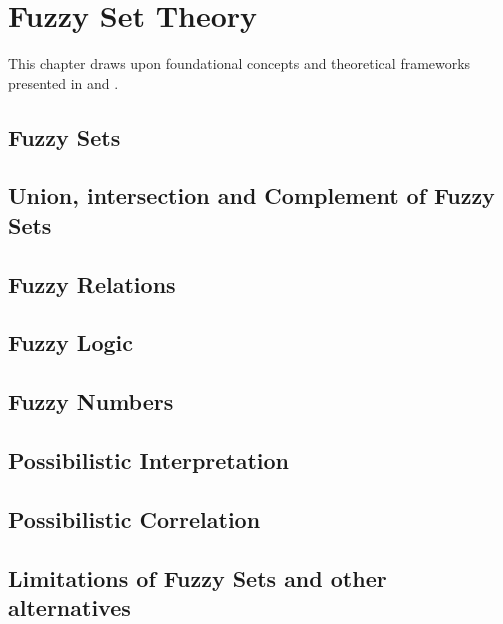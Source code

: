 \chapter{Fuzzy Set Theory}
This chapter draws upon foundational concepts and theoretical frameworks presented in \cite{FULLER1} and \cite{FULLER2}. 

\section{Fuzzy Sets}

\section{Union, intersection and Complement of Fuzzy Sets}

\section{Fuzzy Relations}

\section{Fuzzy Logic}\label{sec:fuzzy_logic}

\section{Fuzzy Numbers}\label{sec:fuzzy_numbers}

\section{Possibilistic Interpretation}


\section{Possibilistic Correlation}
\section{Limitations of Fuzzy Sets and other alternatives}
